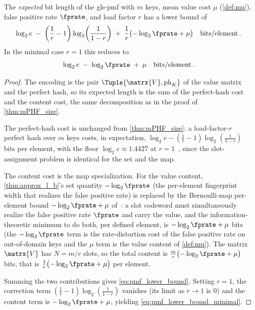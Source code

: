 \documentclass[ ../main.tex]{subfiles}
\begin{document}
\begin{theorem}
\label{thm:pmf_lower_bound}
The \emph{expected} bit length of the \gls{gls-pmf} with $m$ keys, mean value cost $\mu$ (\cref{def:mu}), false positive rate $\fprate$, and load factor $r$ has a lower bound of
\begin{equation}
\label{eq:pmf_lower_bound}
    \log_2 e
    \;-\; \left(\frac{1}{r} - 1\right)\log_2\!\left(\frac{1}{1-r}\right)
    \;+\; \frac{1}{r}\bigl(-\log_2 \fprate + \mu\bigr)
    \quad \si{bits \per element}\,.
\end{equation}
In the minimal case $r = 1$ this reduces to
\begin{equation}
\label{eq:pmf_lower_bound_minimal}
    \log_2 e \;-\; \log_2 \fprate \;+\; \mu \quad \si{bits \per element}\,.
\end{equation}
\end{theorem}
\begin{proof}
The encoding is the pair $\Tuple{\matrx{V}, \ph_K}$ of the value matrix and the perfect hash, so its expected length is the sum of the perfect-hash cost and the content cost, the same decomposition as in the proof of \cref{thm:mPHF_size}.

The perfect-hash cost is unchanged from \cref{thm:mPHF_size}: a load-factor-$r$ perfect hash over $m$ keys costs, in expectation, $\log_2 e - \left(\tfrac{1}{r}-1\right)\log_2\!\left(\tfrac{1}{1-r}\right)$ bits per element, with the floor $\log_2 e \approx \num{1.4427}$ at $r=1$~\cite{mehlhorn1982}, since the slot-assignment problem is identical for the set and the map.

The content cost is the map specialization. For the value content, \cref{thm:approx_l_b}'s set quantity $-\log_2\fprate$ (the per-element fingerprint width that realizes the false positive rate) is replaced by the Bernoulli-map per-element bound $-\log_2 \fprate + \mu$ of~\cite{bmaps,emaps}: a slot codeword must simultaneously realize the false positive rate $\fprate$ and carry the value, and the information-theoretic minimum to do both, per defined element, is $-\log_2 \fprate + \mu$ bits (the $-\log_2\fprate$ term is the rate-distortion cost of the false positive rate on out-of-domain keys and the $\mu$ term is the value content of \cref{def:mu}). The matrix $\matrx{V}$ has $N = m/r$ slots, so the total content is $\tfrac{m}{r}\bigl(-\log_2\fprate + \mu\bigr)$ bits, that is $\tfrac{1}{r}\bigl(-\log_2\fprate + \mu\bigr)$ per element.

Summing the two contributions gives \cref{eq:pmf_lower_bound}. Setting $r = 1$, the correction term $\left(\tfrac{1}{r}-1\right)\log_2\!\left(\tfrac{1}{1-r}\right)$ vanishes (its limit as $r\to 1$ is $0$) and the content term is $-\log_2\fprate + \mu$, yielding \cref{eq:pmf_lower_bound_minimal}.
\end{proof}
\end{document}
